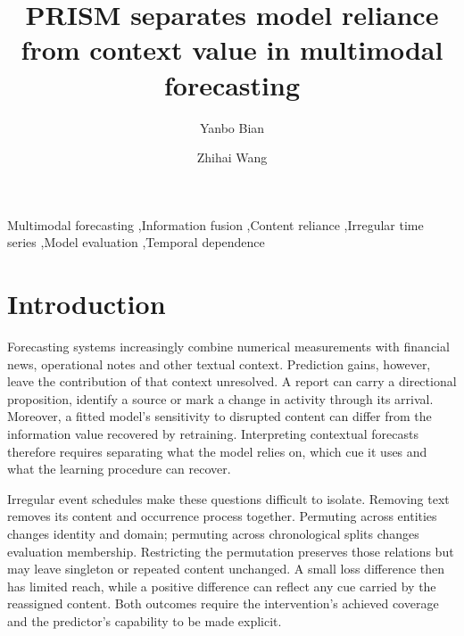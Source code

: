 \documentclass[preprint,11pt]{elsarticle}
\begin{document}
\begin{frontmatter}
\title{PRISM separates model reliance from context value in multimodal forecasting}
\author[inst1]{Yanbo Bian}
\author[inst2]{Zhihai Wang}
\begin{abstract}

\end{abstract}
\begin{keyword}
Multimodal forecasting \sep Information fusion \sep Content reliance \sep Irregular time series \sep Model evaluation \sep Temporal dependence
\end{keyword}
\end{frontmatter}

\section{Introduction}

Forecasting systems increasingly combine numerical measurements with financial news, operational notes and other textual context. Prediction gains, however, leave the contribution of that context unresolved. A report can carry a directional proposition, identify a source or mark a change in activity through its arrival. Moreover, a fitted model's sensitivity to disrupted content can differ from the information value recovered by retraining. Interpreting contextual forecasts therefore requires separating what the model relies on, which cue it uses and what the learning procedure can recover.

Irregular event schedules make these questions difficult to isolate. Removing text removes its content and occurrence process together. Permuting across entities changes identity and domain; permuting across chronological splits changes evaluation membership. Restricting the permutation preserves those relations but may leave singleton or repeated content unchanged. A small loss difference then has limited reach, while a positive difference can reflect any cue carried by the reassigned content. Both outcomes require the intervention's achieved coverage and the predictor's capability to be made explicit.
\end{document}
